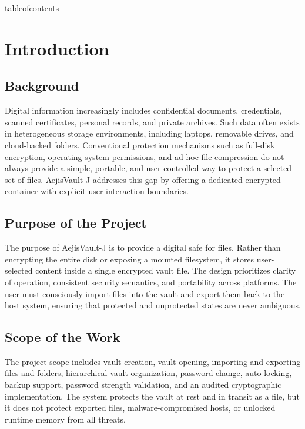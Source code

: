 \documentclass[12pt,a4paper]{report}
\newcommand{\projname}{AejisVault-J}
\begin{document}
\clearpage

\csname tableofcontents\endcsname
\listoffigures
\listoftables
\clearpage


\chapter{Introduction}
\section{Background}
Digital information increasingly includes confidential documents, credentials, scanned certificates, personal records, and private archives. Such data often exists in heterogeneous storage environments, including laptops, removable drives, and cloud-backed folders. Conventional protection mechanisms such as full-disk encryption, operating system permissions, and ad hoc file compression do not always provide a simple, portable, and user-controlled way to protect a selected set of files. \projname{} addresses this gap by offering a dedicated encrypted container with explicit user interaction boundaries.

\section{Purpose of the Project}
The purpose of \projname{} is to provide a digital safe for files. Rather than encrypting the entire disk or exposing a mounted filesystem, it stores user-selected content inside a single encrypted vault file. The design prioritizes clarity of operation, consistent security semantics, and portability across platforms. The user must consciously import files into the vault and export them back to the host system, ensuring that protected and unprotected states are never ambiguous.

\section{Scope of the Work}
The project scope includes vault creation, vault opening, importing and exporting files and folders, hierarchical vault organization, password change, auto-locking, backup support, password strength validation, and an audited cryptographic implementation. The system protects the vault at rest and in transit as a file, but it does not protect exported files, malware-compromised hosts, or unlocked runtime memory from all threats.
\end{document}
